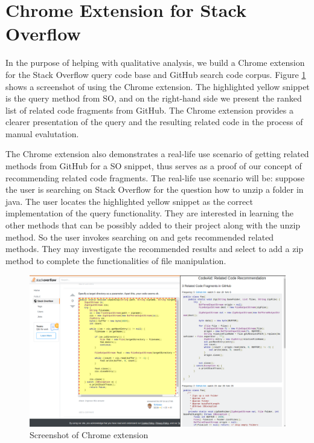 \section{Chrome Extension for Stack Overflow}
\label{sec:chrome}

In the purpose of helping with qualitative analysis, we build a Chrome extension for the Stack Overflow query code base and GitHub search code corpus. Figure \ref{fig:chrome} shows a screenshot of using the Chrome extension. The highlighted yellow snippet is the query method from SO, and on the right-hand side we present the ranked list of related code fragments from GitHub. The Chrome extension provides a clearer presentation of the query and the resulting related code in the process of manual evalutation.

The Chrome extension also demonstrates a real-life use scenario of getting related methods from GitHub for a SO snippet, thus serves as a proof of our concept of recommending related code fragments.
The real-life use scenario will be: suppose the user is searching on Stack Overflow for the question {\ttt how to unzip a folder in java}. The user locates the highlighted yellow snippet as the correct implementation of the query functionality. They are interested in learning the other methods that can be possibly added to their project along with the {\ttt unzip} method. So the user invokes searching on {\tool} and gets recommended related methods. They may investigate the recommended results and select to add a {\ttt zip} method to complete the functionalities of file manipulation. 

\begin{figure}[!h]
	\includegraphics[width=\linewidth]{figures/ui.png}
	\caption{Screenshot of Chrome extension}
	\label{fig:chrome}
\end{figure}